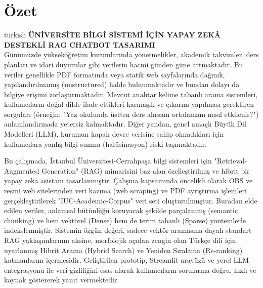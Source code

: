 \documentclass[12pt,a4paper]{report}
\newcommand{\projecttitle}{ÜNİVERSİTE BİLGİ SİSTEMİ İÇİN YAPAY ZEKÂ DESTEKLİ RAG CHATBOT TASARIMI}
\begin{document}
\chapter*{Özet}
\begin{otherlanguage*}{turkish}
\textbf{\projecttitle}\\[0.5cm]

Günümüzde yükseköğretim kurumlarında yönetmelikler, akademik takvimler, ders planları ve idari duyurular gibi verilerin hacmi günden güne artmaktadır. Bu veriler genellikle PDF formatında veya statik web sayfalarında dağınık, yapılandırılmamış (unstructured) halde bulunmaktadır ve bundan dolayı da bilgiye erişimi zorlaştırmaktadır. Mevcut anahtar kelime tabanlı arama sistemleri, kullanıcıların doğal dilde ifade ettikleri karmaşık ve çıkarım yapılması gerektiren sorguları (örneğin: "Yaz okulunda üstten ders alırsam ortalamam nasıl etkilenir?") anlamlandırmada yetersiz kalmaktadır. Diğer yandan, genel amaçlı Büyük Dil Modelleri (LLM), kurumun kapalı devre verisine sahip olmadıkları için kullanıcılara yanlış bilgi sunma (halüsinasyon) riski taşımaktadır.

Bu çalışmada, İstanbul Üniversitesi-Cerrahpaşa bilgi sistemleri için "Retrieval-Augmented Generation" (RAG) mimarisini baz alan özelleştirilmiş ve hibrit bir yapay zeka asistanı tasarlanmıştır. Çalışma kapsamında öncelikli olarak OBS ve resmi web sitelerinden veri kazıma (web scraping) ve PDF ayrıştırma işlemleri gerçekleştirilerek "IUC-Academic-Corpus" veri seti oluşturulmuştur. Buradan elde edilen veriler, anlamsal bütünlüğü koruyacak şekilde parçalanmış (semantic chunking) ve hem vektörel (Dense) hem de terim tabanlı (Sparse) yöntemlerle indekslenmiştir. Sistemin özgün değeri, sadece vektör aramasına dayalı standart RAG yaklaşımlarının aksine, morfolojik açıdan zengin olan Türkçe dili için uyarlanmış Hibrit Arama (Hybrid Search) ve Yeniden Sıralama (Re-ranking) katmanlarını içermesidir. Geliştirilen prototip, Streamlit arayüzü ve yerel LLM entegrasyonu ile veri gizliliğini esas alarak kullanıcıların sorularına doğru, hızlı ve kaynak göstererek yanıt vermektedir.

\end{otherlanguage*}

\end{document}
